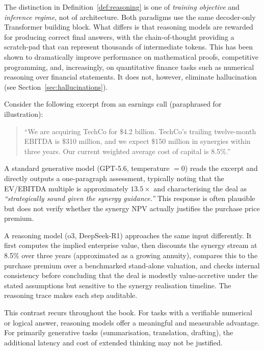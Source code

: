 \begin{context}
\begin{remark}
The distinction in Definition~\ref{def:reasoning} is one of \emph{training
objective} and \emph{inference regime}, not of architecture.  Both paradigms use the
same decoder-only Transformer building block.  What differs is that reasoning models
are rewarded for producing correct final answers, with the chain-of-thought providing
a scratch-pad that can represent thousands of intermediate tokens.  This has been
shown to dramatically improve performance on mathematical proofs, competitive
programming, and, increasingly, on quantitative finance tasks such as numerical
reasoning over financial statements.  It does not, however, eliminate hallucination
(see Section~\ref{sec:hallucinations}).
\end{remark}

\begin{example}
\label{ex:merger-valuation}
Consider the following excerpt from an earnings call (paraphrased for illustration):

\begin{quote}
``We are acquiring TechCo for \$4.2 billion.  TechCo's trailing twelve-month EBITDA
is \$310 million, and we expect \$150 million in synergies within three years.  Our
current weighted average cost of capital is 8.5\%.''
\end{quote}

A standard generative model (GPT-5.6, temperature $= 0$) reads the excerpt and
directly outputs a one-paragraph assessment, typically noting that the EV/EBITDA
multiple is approximately $13.5\times$ and characterising the deal as
\emph{``strategically sound given the synergy guidance.''}  This response is often
plausible but does not verify whether the synergy NPV actually justifies the purchase
price premium.

A reasoning model (o3, DeepSeek-R1) approaches the same input differently.  It first
computes the implied enterprise value, then discounts the synergy stream at 8.5\% over
three years (approximated as a growing annuity), compares this to the purchase premium
over a benchmarked stand-alone valuation, and checks internal consistency before
concluding that the deal is modestly value-accretive under the stated assumptions but
sensitive to the synergy realisation timeline.  The reasoning trace makes each step
auditable.

This contrast recurs throughout the book.  For tasks with a verifiable numerical or
logical answer, reasoning models offer a meaningful and measurable advantage.  For
primarily generative tasks (summarisation, translation, drafting), the additional
latency and cost of extended thinking may not be justified.
\end{example}


\end{context}
